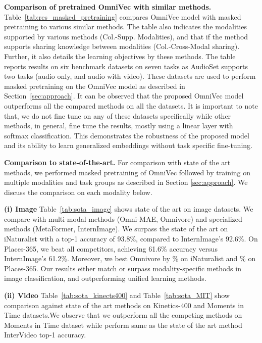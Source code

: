 \noindent\textbf{Comparison of pretrained OmniVec with similar methods.}
Table~\ref{tab:res_masked_pretraining} compares OmniVec model with masked pretraining to various similar methods. The table also indicates the modalities supported by various methods (Col.-Supp. Modalities), and that if the method supports sharing knowledge between modalities (Col.-Cross-Modal sharing). Further, it also details the learning objectives by these methods. The table reports results on six benchmark datasets on seven tasks as AudioSet supports two tasks (audio only, and audio with video). These datasets are used to perform masked pretraining on the OmniVec model as described in Section~\ref{sec:approach}. It can be observed that the proposed OmniVec model outperforms all the compared methods on all the datasets. It is important to note that, we do not fine tune on any of these datasets specifically while other methods, in general, fine tune the results, mostly using a linear layer with softmax classification. This demonstrates the robustness of the proposed model and its ability to learn generalized embeddings without task specific fine-tuning. 




\noindent\textbf{Comparison to state-of-the-art.} For comparison with state of the art methods, we performed masked pretraining of OmniVec followed by training on multiple modalities and task groups as described in Section \ref{sec:approach}. We discuss the comparison on each modality below.

\noindent\textbf{(i) Image}
Table~\ref{tab:sota_image} shows state of the art on image datasets. We compare with multi-modal methods (Omni-MAE, Omnivore) and specialized methods (MetaFormer, InternImage). We surpass the state of the art on iNaturalist with a top-1 accuracy of 93.8\%, compared to InternImage's 92.6\%. On Places-365, we beat all competitors, achieving 61.6\% accuracy versus InternImage's 61.2\%. Moreover, we best Omnivore by  \% on iNaturalist and  \% on Places-365. Our results either match or surpass modality-specific methods in image classification, and outperforming unified learning methods.


\noindent\textbf{(ii) Video} Table~\ref{tab:sota_kinects400} and Table~\ref{tab:sota_MIT} show comparison against state of the art methods on Kinetics-400 and Moments in Time datasets.We observe that we outperform all the competing methods on Moments in Time dataset while perform same as the state of the art method InterVideo  \ie  top-1 accuracy.    


